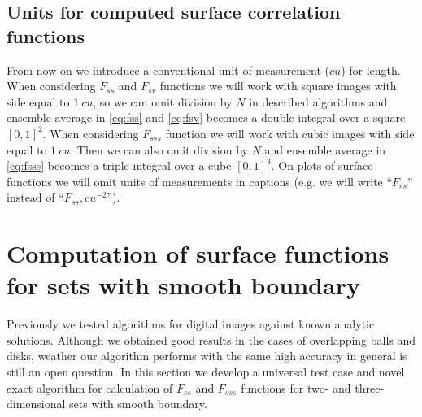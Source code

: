 \documentclass[1p]{elsarticle}
\begin{document}
\subsection{Units for computed surface correlation functions}
From now on we introduce a conventional unit of measurement ($cu$) for length.
When considering $F_{ss}$ and $F_{sv}$ functions we will work with square images
with side equal to $1\ cu$, so we can omit division by $N$ in described
algorithms and ensemble average in \cref{eq:fss} and \cref{eq:fsv} becomes a
double integral over a square $[0, 1]^2$. When considering $F_{sss}$ function we
will work with cubic images with side equal to $1\ cu$. Then we can also omit
division by $N$ and ensemble average in \cref{eq:fsss} becomes a triple integral
over a cube $[0, 1]^3$. On plots of surface functions we will omit units of
measurements in captions (e.g. we will write ``$F_{ss}$'' instead of
``$F_{ss}, cu^{-2}$'').

\section{Computation of surface functions for sets with smooth boundary}
\label{sec:algo-precise}
Previously \cite{Samarin} we tested algorithms for digital images against known
analytic solutions. Although we obtained good results in the cases of
overlapping balls and disks, weather our algorithm performs with the same high
accuracy in general is still an open question. In this section we develop a
universal test case and novel exact algorithm for calculation of $F_{ss}$ and
$F_{sss}$ functions for two- and three-dimensional sets with smooth boundary.
\end{document}
